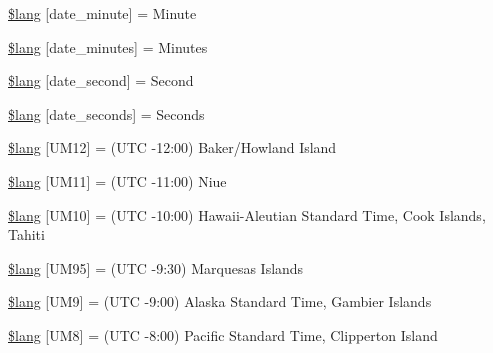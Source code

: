 \begin{DoxyCompactItemize}
\item 
\mbox{\hyperlink{date__lang_8php_a53da1296d1dbbb36f19d526a4068097b}{\$lang}} \mbox{[}\textquotesingle{}date\+\_\+minute\textquotesingle{}\mbox{]} = \textquotesingle{}Minute\textquotesingle{}
\item 
\mbox{\hyperlink{date__lang_8php_a25b3a5d4d33a6edc34d328a7e834d453}{\$lang}} \mbox{[}\textquotesingle{}date\+\_\+minutes\textquotesingle{}\mbox{]} = \textquotesingle{}Minutes\textquotesingle{}
\item 
\mbox{\hyperlink{date__lang_8php_a8aae9b47730f6718515b9f08924741f8}{\$lang}} \mbox{[}\textquotesingle{}date\+\_\+second\textquotesingle{}\mbox{]} = \textquotesingle{}Second\textquotesingle{}
\item 
\mbox{\hyperlink{date__lang_8php_accf5b5584cd576f26304961c994f8118}{\$lang}} \mbox{[}\textquotesingle{}date\+\_\+seconds\textquotesingle{}\mbox{]} = \textquotesingle{}Seconds\textquotesingle{}
\item 
\mbox{\hyperlink{date__lang_8php_a25fe9da71ed486c8544c851f22942fde}{\$lang}} \mbox{[}\textquotesingle{}U\+M12\textquotesingle{}\mbox{]} = \textquotesingle{}(U\+TC -\/12\+:00) Baker/Howland Island\textquotesingle{}
\item 
\mbox{\hyperlink{date__lang_8php_abf94d9f775892861f954167aea9d7499}{\$lang}} \mbox{[}\textquotesingle{}U\+M11\textquotesingle{}\mbox{]} = \textquotesingle{}(U\+TC -\/11\+:00) Niue\textquotesingle{}
\item 
\mbox{\hyperlink{date__lang_8php_a575da8cd93146d40c5a929a7bf0144e7}{\$lang}} \mbox{[}\textquotesingle{}U\+M10\textquotesingle{}\mbox{]} = \textquotesingle{}(U\+TC -\/10\+:00) Hawaii-\/Aleutian Standard Time, Cook Islands, Tahiti\textquotesingle{}
\item 
\mbox{\hyperlink{date__lang_8php_a41f56156bb7619078e4f6f70364c99c2}{\$lang}} \mbox{[}\textquotesingle{}U\+M95\textquotesingle{}\mbox{]} = \textquotesingle{}(U\+TC -\/9\+:30) Marquesas Islands\textquotesingle{}
\item 
\mbox{\hyperlink{date__lang_8php_ae2fb16043175559d9ce90c2cbdcf0616}{\$lang}} \mbox{[}\textquotesingle{}U\+M9\textquotesingle{}\mbox{]} = \textquotesingle{}(U\+TC -\/9\+:00) Alaska Standard Time, Gambier Islands\textquotesingle{}
\item 
\mbox{\hyperlink{date__lang_8php_a259d60e179b8d8385f6f63a492b460dc}{\$lang}} \mbox{[}\textquotesingle{}U\+M8\textquotesingle{}\mbox{]} = \textquotesingle{}(U\+TC -\/8\+:00) Pacific Standard Time, Clipperton Island\textquotesingle{}
\item 

\end{DoxyCompactItemize}
